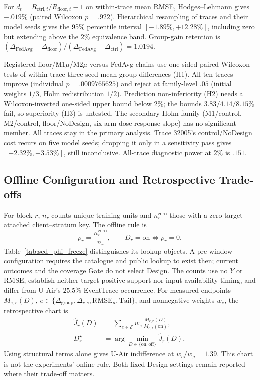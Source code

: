 For $d_t=R_{\mathrm{ctrl},t}/R_{\mathrm{floor},t}-1$ on within-trace mean RMSE,
Hodges--Lehmann gives $-.019\%$ (paired Wilcoxon $p=.922$).
Hierarchical resampling of traces and their model seeds gives the 95\%
percentile interval $[-1.89\%,+12.28\%]$, including zero but extending above
the $2\%$ equivalence band. Group-gain retention is
$(\overline\Delta_{\mathrm{FedAvg}}-\overline\Delta_{\mathrm{floor}})/
(\overline\Delta_{\mathrm{FedAvg}}-\overline\Delta_{\mathrm{ctrl}})=1.0194$.

Registered floor/M1$\mu$/M2$\mu$ versus FedAvg chains use one-sided paired
Wilcoxon tests of within-trace three-seed mean group differences (H1). All
ten traces improve (individual $p=.0009765625$) and reject at family-level
$.05$ (initial weights $1/3$, Holm redistribution $1/2$). Prediction
non-inferiority (H2) needs a Wilcoxon-inverted one-sided upper bound below
$2\%$; the bounds $3.83/4.14/8.15\%$ fail, so superiority (H3) is untested.
The secondary Holm family (M1/control, M2/control, floor/NoDesign, six-arm
dose-response slope) has no significant member. All traces stay in the
primary analysis. Trace 32005's control/NoDesign cost recurs on five model
seeds; dropping it only in a sensitivity pass gives $[-2.32\%,+3.53\%]$,
still inconclusive. All-trace diagnostic power at $2\%$ is $.151$.

\subsection{Offline Configuration and Retrospective Trade-offs}
For block $r$, $n_r$ counts unique training units and $n_r^{\mathrm{zero}}$
those with a zero-target attached client--stratum key. The offline rule is
\begin{equation}
\rho_r=\frac{n^{\mathrm{zero}}_r}{n_r},
\qquad
D_r=\mathrm{on}\iff\rho_r=0 .
\label{eq:design_gate}
\end{equation}
Table~\ref{tab:scd_phi_freeze} distinguishes its lookup objects. A pre-window
configuration requires the catalogue and public lookup to exist then;
current outcomes and the coverage Gate do not select Design. The counts
use no $Y$ or RMSE, establish neither target-positive support nor input
availability timing, and differ from U-Air's $25.5\%$ EventTrace occurrence.
For measured endpoints $M_{e,r}(D)$,
$e\in\{\Delta_{\mathrm{group}},\Delta_{c\text{-}s},\mathrm{RMSE}_{\mu},\mathrm{Tail}\}$,
and nonnegative weights $w_e$, the retrospective chart is
\begin{equation}
\begin{aligned}
\widehat J_r(D)&=\sum_{e\in\mathcal{E}}w_e\,\frac{M_{e,r}(D)}{M_{e,r}(\mathrm{on})},\\
D_r^{\star}&=\arg\min_{D\in\{\mathrm{on},\mathrm{off}\}}\widehat J_r(D),
\end{aligned}
\label{eq:design_switch}
\end{equation}
Using structural terms alone gives U-Air indifference at $w_c/w_g=1.39$.
This chart is not the experiments' online rule. Both fixed Design settings
remain reported where their trade-off matters.

